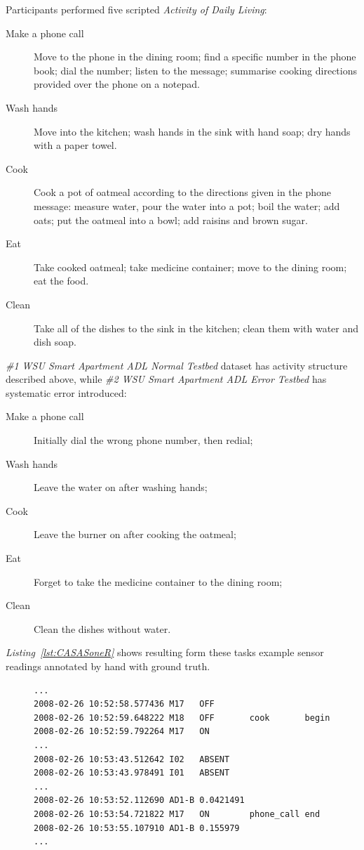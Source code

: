 \documentclass[12pt, a4paper, pdflatex, leqno, twoside, openright]{report}
\begin{document}
Participants performed five scripted \emph{Activity of Daily Living}:
\begin{description}
\item[Make a phone call] Move to the phone in the dining room; find a specific number in the phone book; dial the number; listen to the message; summarise cooking directions provided over the phone on a notepad.
\item[Wash hands] Move into the kitchen; wash hands in the sink with hand soap; dry hands with a paper towel.
\item[Cook] Cook a pot of oatmeal according to the directions given in the phone message: measure water, pour the water into a pot; boil the water; add oats; put the oatmeal into a bowl; add raisins and brown sugar.
\item[Eat] Take cooked oatmeal; take medicine container; move to the dining room; eat the food.
\item[Clean] Take all of the dishes to the sink in the kitchen; clean them with water and dish soap.
\end{description}

\emph{\#1 WSU Smart Apartment ADL Normal Testbed} dataset has activity structure described above, while \emph{\#2 WSU Smart Apartment ADL Error Testbed} has systematic error introduced:
\begin{description}
\item[Make a phone call] Initially dial the wrong phone number, then redial;
\item[Wash hands] Leave the water on after washing hands;
\item[Cook] Leave the burner on after cooking the oatmeal;
\item[Eat] Forget to take the medicine container to the dining room;
\item[Clean] Clean the dishes without water.
\end{description}

\emph{Listing~\ref{lst:CASASoneR}} shows resulting form these tasks example sensor readings annotated by hand with ground truth.
\begin{figure}[htb]
  \begin{lstlisting}
...
2008-02-26 10:52:58.577436 M17   OFF
2008-02-26 10:52:59.648222 M18   OFF       cook       begin
2008-02-26 10:52:59.792264 M17   ON
...
2008-02-26 10:53:43.512642 I02   ABSENT
2008-02-26 10:53:43.978491 I01   ABSENT
...
2008-02-26 10:53:52.112690 AD1-B 0.0421491
2008-02-26 10:53:54.721822 M17   ON        phone_call end
2008-02-26 10:53:55.107910 AD1-B 0.155979
...
  \end{lstlisting}
\end{figure}
\end{document}
